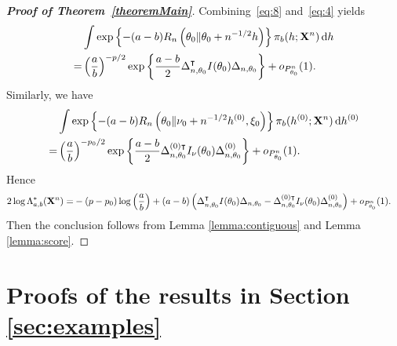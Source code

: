 \documentclass[11pt]{article}
\newcommand{\myT}{\intercal}
\theoremstyle{plain}
\theoremstyle{definition}
\theoremstyle{remark}
\begin{document}
\begin{appendices}
\begin{proof}[\textbf{Proof of Theorem~\ref{theoremMain}}]
Combining~\eqref{eq:8} and~\eqref{eq:4} yields
\begin{equation*}
    \begin{split}
    &\int 
\exp\left\{ - (a-b) R_n \left( \theta_0 \| \theta_0 + n^{-1/2} h \right) \right\}
    \pi_b (h;\BX^{n})  \, \mathrm dh
    \\
    =&\left(\frac{a}{b}\right)^{-p/2} \exp\left\{\frac{a-b}{2}\Delta_{n,\theta_0}^\myT  I(\theta_0)\Delta_{n,\theta_0}\right\}+o_{P_{\theta_0}^n}(1).
    \end{split}
\end{equation*}
Similarly, we have
\begin{equation*}
    \begin{split}
    &\int 
\exp\left\{ - (a-b) R_n \left( \theta_0 \| \nu_0 + n^{-1/2} h^{(0)}, \xi_0 \right) \right\}
    \pi_b (h^{(0)};\BX^{n})  \, \mathrm dh^{(0)}
    \\
    =&\left(\frac{a}{b}\right)^{-p_0/2} \exp\left\{\frac{a-b}{2}\Delta_{n,\theta_0}^{(0)\myT} I_\nu(\theta_0)\Delta^{(0)}_{n,\theta_0}\right\}+o_{P_{\theta_0}^n}(1).
    \end{split}
\end{equation*}
Hence
\begin{equation*}
    \begin{aligned} 
        2\log \Lambda_{a,b}^* (\BX^n)
        =&
        -{(p-p_0)}\log \left(\frac{a}{b}\right)+{(a-b)}\left(
            \Delta_{n,\theta_0}^\myT  I(\theta_0) \Delta_{n,\theta_0}
        -\Delta_{n,\theta_0}^{(0)\myT} I_\nu(\theta_0)\Delta^{(0)}_{n,\theta_0}\right)
        +o_{P^n_{\theta_0}}(1).
    \end{aligned}
\end{equation*}
Then the conclusion follows from Lemma \ref{lemma:contiguous} and Lemma \ref{lemma:score}.
\end{proof}

\section{Proofs of the results in Section \ref{sec:examples}}


\end{appendices}
\end{document}
